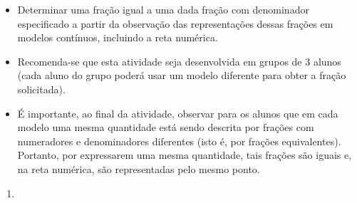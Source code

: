 \Bg
\Bg
\begin{multicols}{2}
\begin{objetivos}[label=chap4-ativ8]{}{}
\begin{itemize} %
    \item       Determinar uma fração igual a uma dada fração com denominador
especificado a partir da observação das representações dessas frações em
modelos contínuos, incluindo a reta numérica.
\end{itemize} %

\end{objetivos}

\begin{orientacoes}

\begin{itemize} %
    \item       Recomenda-se que esta atividade seja desenvolvida em grupos de 3
alunos (cada aluno do grupo poderá usar um modelo diferente para obter a fração
solicitada).
    \item      É importante, ao final da atividade, observar para os alunos que em cada modelo uma mesma quantidade está sendo descrita por frações com numeradores e denominadores diferentes (isto é, por frações equivalentes). Portanto, por expressarem uma mesma quantidade, tais frações são iguais e, na reta numérica, são representadas pelo mesmo ponto.
\end{itemize} %




\end{orientacoes}

\begin{solucao}{}{}
\begin{enumerate} [\quad a)] %
    \item      \mbox{ }
\begin{center}
\end{center}
\end{enumerate}
\end{solucao}
\end{multicols}
